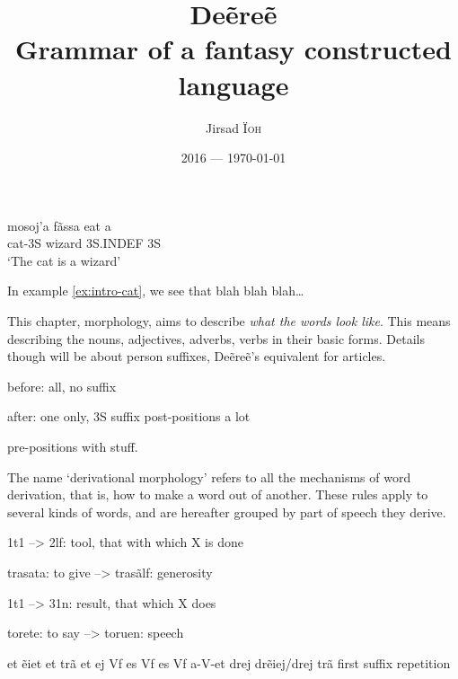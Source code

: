 \documentclass[a4paper, oneside]{book}
\title{Deẽreẽ\\Grammar of a fantasy constructed language}
\author{Jirsad \textsc{Ïoh}}
\date{2016 — \today}
\begin{document}
\frontmatter
\maketitle
\tableofcontents
{}
\begin{exe}
\ex\label{ex:intro-cat}
\gll mosoj’a fãssa eat a\\
cat-3S wizard 3S.INDEF 3S\\
\trans ‘The cat is a wizard’
\end{exe}

In example \ref{ex:intro-cat}, we see that blah blah blah…

\mainmatter
\label{chap:phonology}


\label{chap:morphology}
This chapter, morphology, aims to describe \emph{what the words look like}. This means describing
the nouns, adjectives, adverbs, verbs in their basic forms. Details though will be about person
suffixes, Deẽreẽ’s equivalent for articles.





before: all, no suffix

after: one only, 3S suffix
post-positions a lot

pre-positions with stuff.

\label{chap:derivational-morphology}
The name ‘derivational morphology’ refers to all the mechanisms of word derivation, that is, how to
make a word out of another. These rules apply to several kinds of words, and are hereafter grouped
by part of speech they derive.

1t1 --> 2lf: tool, that with which X is done

trasata: to give --> trasãlf: generosity

1t1 --> 31n: result, that which X does

torete: to say --> toruen: speech

\label{chap:conjugation}
et
ẽiet
et trã
et
ej
Vf es
Vf es
Vf a-V-et
drej
drẽiej/drej trã
first suffix repetition
\end{document}
